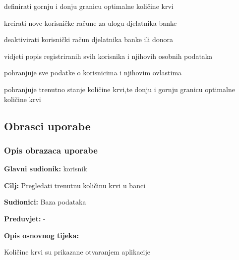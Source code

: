\documentclass[11pt]{book}
\begin{document}
\begin{packed_enum}
\begin{packed_enum}
		\item definirati gornju i donju granicu optimalne količine krvi
		\item kreirati nove korisničke račune za ulogu djelatnika banke
		\item deaktivirati korisnički račun djelatnika banke ili donora
		\item vidjeti popis registriranih svih korisnika i njihovih osobnih podataka
		
	\end{packed_enum}
	
	\item  {}
	
	\begin{packed_enum}
		
		\item pohranjuje sve podatke o korisnicima i njihovim ovlastima
		\item pohranjuje trenutno stanje količine krvi,te donju i gornju granicu optimalne količine krvi
		
	\end{packed_enum}
\end{packed_enum}

\eject 



\subsection{Obrasci uporabe}

\subsubsection{Opis obrazaca uporabe}


\noindent {}
					\begin{packed_item}
	
						\item \textbf{Glavni sudionik: }korisnik
						\item \textbf{Cilj:} Pregledati trenutnu količinu krvi u banci
						\item \textbf{Sudionici:} Baza podataka
						\item \textbf{Preduvjet:} -
						\item \textbf{Opis osnovnog tijeka:}
						
						\item[] \begin{packed_enum}
	
							\item Količine krvi su prikazane otvaranjem aplikacije
							\item  
							
						\end{packed_enum}

					\end{packed_item}
\end{document}

